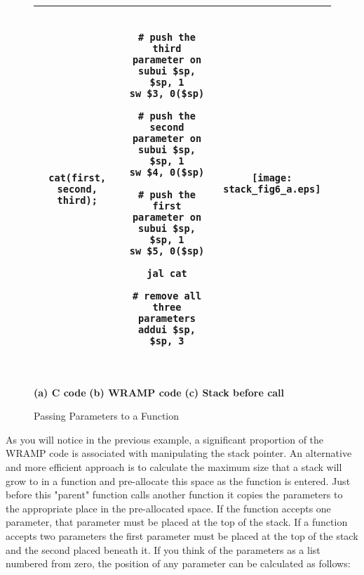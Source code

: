 %
%
\begin{figure}[!hbtp]
\begin{center}
\begin{footnotesize}
\begin{tabular}{|c|c|c|}
\hline
\begin{minipage}[t]{4.8cm}
\begin{verbatim}

cat(first, second, third);

\end{verbatim}
\end{minipage}
&
\begin{minipage}[c]{5.5cm}
\vspace{\topsep}
\begin{verbatim}

# push the third parameter on
subui $sp, $sp, 1
sw $3, 0($sp)

# push the second parameter on
subui $sp, $sp, 1
sw $4, 0($sp)

# push the first parameter on
subui $sp, $sp, 1
sw $5, 0($sp)

jal cat

# remove all three parameters
addui $sp, $sp, 3

\end{verbatim}
\end{minipage}
&
\begin{minipage}{4.2cm}
\begin{center}
\texttt{[image: stack\_fig6\_a.eps]}
\end{center}
\end{minipage}\\
\hline
\end{tabular}
\\
\textbf{(a) C code}
\hspace{3cm}
\textbf{(b) WRAMP code}
\hspace{3cm}
\textbf{(c) Stack before call}\\

\caption{Passing Parameters to a Function}
\label{fig:parampassing}
\end{footnotesize}
\end{center}
\end{figure}

As you will notice in the previous example, a significant proportion of
the WRAMP code is associated with manipulating the stack pointer. An
alternative and more efficient approach is to calculate the maximum
size that a stack will grow to in a function and pre-allocate this
space as the function is entered. Just before this "parent" function
calls another function it copies the parameters to the appropriate
place in the pre-allocated space. If the function accepts one
parameter, that parameter must be placed at the top of the stack. If a
function accepts two parameters the first parameter must be placed at
the top of the stack and the second placed beneath it. If you think
of the parameters as a list numbered from zero, the position of any
parameter can be calculated as follows:

